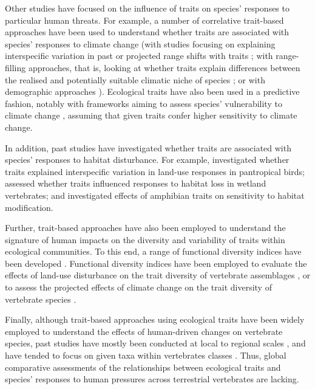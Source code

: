 Other studies have focused on the influence of traits on species' responses to particular human threats. For example, a number of correlative trait-based approaches have been used to understand whether traits are associated with species' responses to climate change (with studies focusing on explaining interspecific variation in past or projected range shifts with traits \citep{Schloss2012a, Mccain2014a, Pacifici2017, DiMarco2021}; with range-filling approaches, that is, looking at whether traits explain differences between the realised and potentially suitable climatic niche of species \citep{Estrada2018}; or with demographic approaches \citep{Spooner2018, Capdevila2022}). Ecological traits have also been used in a predictive fashion, notably with frameworks aiming to assess species' vulnerability to climate change \citep{Foden2013, Pacifici2015}, assuming that given traits confer higher sensitivity to climate change. 

In addition, past studies have investigated whether traits are associated with species' responses to habitat disturbance. For example, \citet{Newbold2013} investigated whether traits explained interspecific variation in land-use responses in pantropical birds; \citet{Quesnelle2014} assessed whether traits influenced responses to habitat loss in wetland vertebrates; and \citet{Nowakowski2017} investigated effects of amphibian traits on sensitivity to habitat modification.

Further, trait-based approaches have also been employed to understand the signature of human impacts on the diversity and variability of traits within ecological communities. To this end, a range of functional diversity indices have been developed \citep{Schleuter2010a, Legras2018}. Functional diversity indices have been employed to evaluate the effects of land-use disturbance on the trait diversity of vertebrate assemblages \citep{Flynn2009, LaSorte2018, Tinoco2018}, or to assess the projected effects of climate change on the trait diversity of vertebrate species \citep{Stewart2022}.

Finally, although trait-based approaches using ecological traits have been widely employed to understand the effects of human-driven changes on vertebrate species, past studies have mostly been conducted at local to regional scales \citep{Davison2021}, and have tended to focus on given taxa within vertebrates classes \citep{Hevia2017}. Thus, global comparative assessments of the relationships between ecological traits and species' responses to human pressures across terrestrial vertebrates are lacking.


